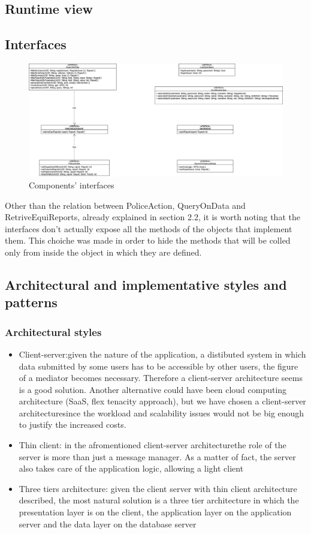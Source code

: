 \subsection{Runtime view}
\newpage
\subsection{Interfaces}
\begin{figure}[h!]
	\centering
	\includegraphics[width=\textwidth]{Images/interface_diagram}
	\caption{Components' interfaces}
\end{figure}
Other than the relation between PoliceAction, QueryOnData and RetriveEquiReports, already explained in section 2.2, it is worth noting that the interfaces don't actually expose all the methods of the objects that implement them. This choiche was made in order to hide the methods that will be colled only from inside the object in which they are defined.
\newpage 
\subsection{Architectural and implementative styles and patterns}
\subsubsection{Architectural styles}
\begin{itemize}
	\item Client-server:given the nature of the application, a distibuted system in which data submitted by some users has to be accessible by other users, the figure of a mediator becomes necessary. Therefore a client-server architecture seems is a good solution. Another alternative could have been cloud computing architecture (SaaS, flex tenacity approach), but we have chosen a client-server architecturesince the workload and scalability issues would not be big enough to justify the increased costs.
	\item Thin client: in the afromentioned client-server architecturethe role of the server is more than just a message manager. As a matter of fact, the server also takes care of the application logic, allowing a light client
	\item Three tiers architecture: given the client server with thin client architecture described, the most natural solution is a three tier architecture in which the presentation layer is on the client, the application layer on the application server and the data layer on the database server 
\end{itemize}
